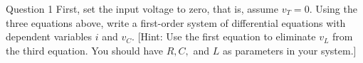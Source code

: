 \documentclass[preview]{standalone}
\begin{document}
\begin{center}
Question 1 
 First, set the input voltage to zero, that is, assume $v_T = 0$. Using the three equations
                        above, write a first-order system of differential equations with dependent variables $i$
                        and $v_C$. [Hint: Use the first equation to eliminate $v_L$ from the third equation. You
                        should have $R, C,$ and $L$ as parameters in your system.]
\end{center}
\end{document}
